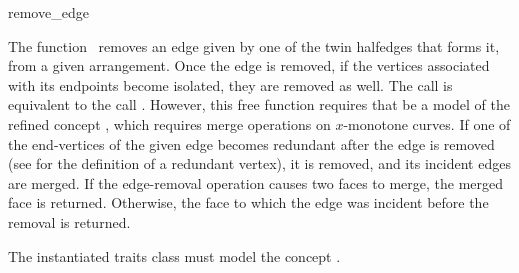 \ccRefPageBegin

\begin{ccRefFunction}{remove_edge}

\ccDefinition

The function \ccRefName\ removes an edge given by one of the twin halfedges
that forms it, from a given arrangement. Once the edge is removed, if the
vertices associated with its endpoints become isolated, they are removed as
well. The call  is equivalent to the call
. However, this free function requires
that  be a model of the refined concept
, which requires merge operations
on $x$-monotone curves. If one of the end-vertices of the given edge
becomes redundant after the edge is removed (see 
for the definition of a redundant vertex), it is removed, and its
incident edges are merged.
If the edge-removal operation causes two faces to merge, the merged face
is returned. Otherwise, the face to which the edge was incident before the
removal is returned.



The instantiated traits class must model the concept
. 

\end{ccRefFunction}

\ccRefPageEnd
